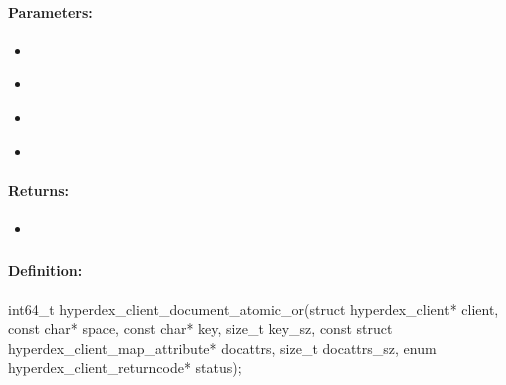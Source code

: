 \paragraph{Parameters:}
\begin{itemize}[noitemsep]
\item {}\\

\item {}\\

\item {}\\

\item {}\\

\end{itemize}

\paragraph{Returns:}
\begin{itemize}[noitemsep]
\item {}\\

\end{itemize}

\pagebreak
\subsubsection{}
\label{api:c:document_atomic_or}


\paragraph{Definition:}
\begin{ccode}
int64_t hyperdex_client_document_atomic_or(struct hyperdex_client* client,
        const char* space,
        const char* key, size_t key_sz,
        const struct hyperdex_client_map_attribute* docattrs, size_t docattrs_sz,
        enum hyperdex_client_returncode* status);
\end{ccode}

